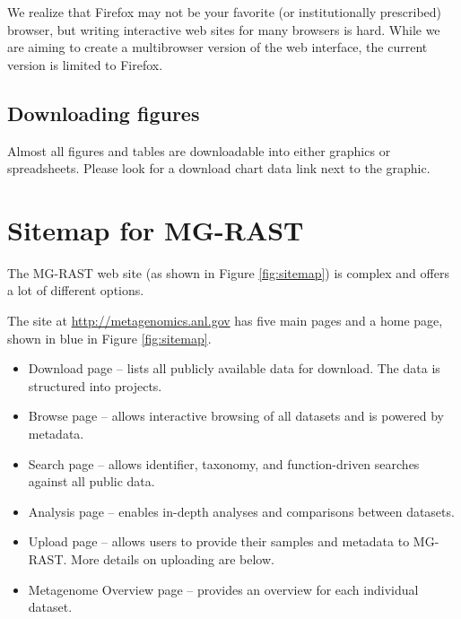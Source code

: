 \documentclass[12pt,fullpage]{report}
\begin{document}
We realize that Firefox may not be your favorite (or institutionally prescribed) browser, but writing
interactive web sites for many browsers is hard. While we are aiming to create a multibrowser version of the web interface, the current version is limited to Firefox.
\subsection{Downloading figures}
Almost all figures and tables are downloadable into either graphics or spreadsheets. Please look for
a download chart data link next to the graphic.
\section{Sitemap for MG-RAST}
\label{section:sitemap}
The MG-RAST web site (as shown in Figure \ref{fig:sitemap}) is complex and offers a lot of
different options.

\noindent The site at \url{http://metagenomics.anl.gov} has five main pages
and a home page,
shown in blue in Figure \ref{fig:sitemap}.

\begin{itemize}
\item Download page -- 
lists all publicly available data for download. The data is structured into projects.

\item Browse page --
allows interactive browsing of all datasets and is powered by metadata.

\item Search page --
allows identifier, taxonomy, and function-driven searches against all public data.

\item Analysis page --
enables in-depth analyses and comparisons between datasets.

\item Upload page --
allows users to provide their samples and metadata to MG-RAST. More details on uploading are below.

\item Metagenome Overview page --
provides an overview
for each individual dataset.
\end{itemize}
\end{document}

